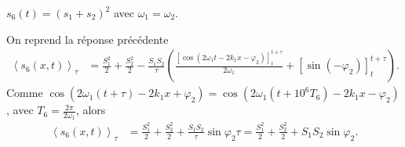 

\begin{enonce}
	$s_6\left( t \right) = \left( s_1 + s_2 \right)^2 $ avec $\omega_1 = \omega_2$.
	\end{enonce}
				
				
	\begin{corrige}
	On reprend la réponse précédente
		\begin{align*}
			\left< s_6\left( x,t \right) \right>_{\tau} &= \frac{S_1^2}{2} + \frac{S_2^2}{2} - \frac{S_1S_2}{\tau} \left( \frac{ \left[ \cos\left( 2 \omega_1 t - 2 k_1 x - \varphi_2 \right) \right]^{t+\tau}_{t} }{ 2\omega_1 } + \left[ \sin \left(-\varphi_2\right) \right]^{t+\tau}_{t} \right).
		\end{align*}
		Comme $\cos\left( 2\omega_1 \left( t+\tau \right) - 2 k_1 x + \varphi_2\right) = \cos\left( 2\omega_1 \left( t+10^6 T_6 \right) - 2 k_1 x - \varphi_2\right)$, avec $T_6 = \frac{2\pi}{ 2\omega_1}$, alors
		\begin{align*}
			\left< s_6\left( x,t \right) \right>_{\tau} &= \frac{S_1^2}{2} + \frac{S_2^2}{2} +\frac{S_1S_2}{\tau} \sin \varphi_2 \tau =  \frac{S_1^2}{2} + \frac{S_2^2}{2} +S_1 S_2 \sin \varphi_2.
		\end{align*}
	
		\end{corrige}
	

\finEntrainement






